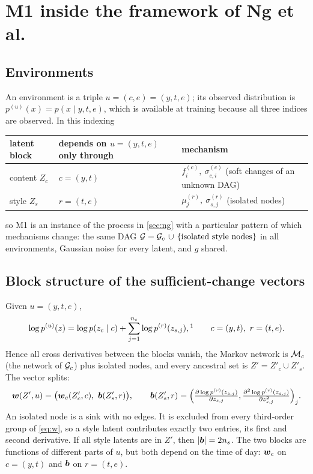 \section{M1 inside the framework of Ng et al.}
\label{sec:apply}

\subsection{Environments}
An environment is a triple $u=(c,e)=(y,t,e)$; its observed distribution is
$p^{(u)}(x)=p(x\mid y,t,e)$, which is available at training because all three indices are observed. 
In this indexing
\begin{center}
\begin{tabular}{@{}lll@{}}
\toprule
latent block & \shortstack[l]{depends on $u=(y,t,e)$\\only through} & mechanism\\
\midrule
content $Z_c$ & $c=(y,t)$ & $f_i^{(c)},\ \sigma_{c,i}^{(c)}$ (soft changes of an unknown DAG)\\
style $Z_s$ & $r=(t,e)$ & $\mu_j^{(r)},\ \sigma_{s,j}^{(r)}$ (isolated nodes)\\
\bottomrule
\end{tabular}
\end{center}
so M1 is an instance of the process in \cref{sec:ng} with a particular pattern of which mechanisms
change: the same DAG $\mathcal{G}=\mathcal{G}_c\,\cup\,\{\text{isolated style nodes}\}$ in all environments, Gaussian 
noise for every latent, and $g$ shared.

\subsection{Block structure of the sufficient-change vectors}
Given $u=(y,t,e)$,
\[
\log p^{(u)}(z)=\log p(z_c\mid c)+\sum_{j=1}^{n_s}\log p^{(r)}(z_{s,j}),\footnotemark \qquad c=(y,t),\ r=(t,e).
\]
%
Hence all cross derivatives between the blocks vanish, the Markov network is $\mathcal{M}_c$ (the network of
$\mathcal{G}_c$) plus isolated nodes, and every ancestral set is $Z'=Z'_c\cup Z'_s$. The vector splits:
\begin{equation}
\boldsymbol{w}(Z',u)=\bigl(\boldsymbol{w}_c(Z'_c,c),\ \boldsymbol{b}(Z'_s,r)\bigr),
\qquad \boldsymbol{b}(Z'_s,r)=\Bigl(\tfrac{\partial\log p^{(r)}(z_{s,j})}{\partial z_{s,j}},
\tfrac{\partial^2\log p^{(r)}(z_{s,j})}{\partial z_{s,j}^2}\Bigr)_{j}.
\label{eq:split}
\end{equation}
An isolated node is a sink with no edges. It is excluded from every third-order group of
\cref{eq:w}, so a style latent contributes exactly two entries, its first and second derivative. If
all style latents are in $Z'$, then $|\boldsymbol{b}|=2n_s$. The two blocks are functions of different parts of $u$,
but both depend on the time of day: $\boldsymbol{w}_c$ on $c=(y,t)$ and $\boldsymbol{b}$ on $r=(t,e)$.
\newpage
